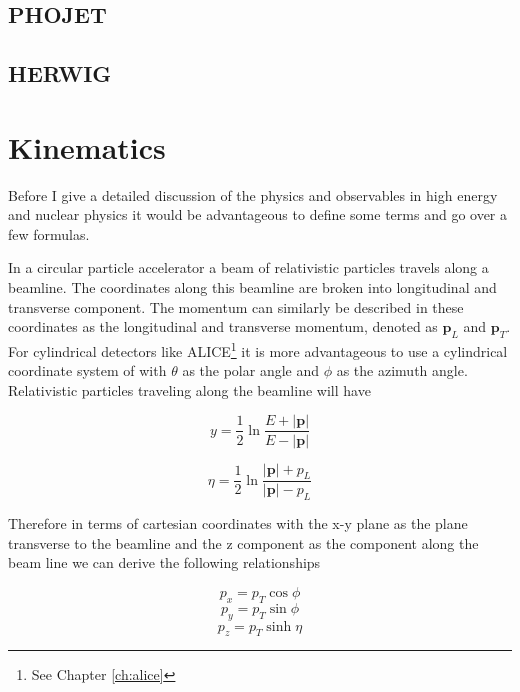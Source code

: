 \subsection{PHOJET}

\subsection{HERWIG}



\section{Kinematics}\label{sec:kinematics}
Before I give a detailed discussion of the physics and observables in high energy and nuclear physics it would be advantageous to define some terms and go over a few formulas.

In a circular particle accelerator a beam of relativistic particles travels along a beamline.  The coordinates along this beamline are broken into longitudinal and transverse component. The momentum can similarly be described in these coordinates as the longitudinal and transverse momentum, denoted as $\mathbf{p}_{L}$ and $\mathbf{p}_{T}$.  For cylindrical detectors like ALICE\footnote{See Chapter \ref{ch:alice}} it is more advantageous to use a cylindrical coordinate system of with $\theta$ as the polar angle and $\phi$ as the azimuth angle.  Relativistic particles traveling along the beamline will have 

\begin{equation}
\textit{y} = \frac{1}{2} \ln \frac{E + |\mathbf{p}|}{E - |\mathbf{p}|}
\label{eq:rapidity}
\end{equation}

\begin{equation}
\eta = \frac{1}{2} \ln \frac{|\mathbf{p}| + p_{L}}{|\mathbf{p}| - p_{L}}
\label{eq:psuedo}
\end{equation}

\noindent
Therefore in terms of cartesian coordinates with the x-y plane as the plane transverse to the beamline and the z component as the component along the beam line we can derive the following relationships

\begin{equation}
p_{x} = p_{T} \cos \phi
\label{eq:xcomp}
\end{equation}
\begin{equation}
p_{y} = p_{T} \sin \phi
\label{eq:ycomp}
\end{equation}
\begin{equation}
p_{z} = p_{T} \sinh \eta
\label{eq:zcomp}
\end{equation}

